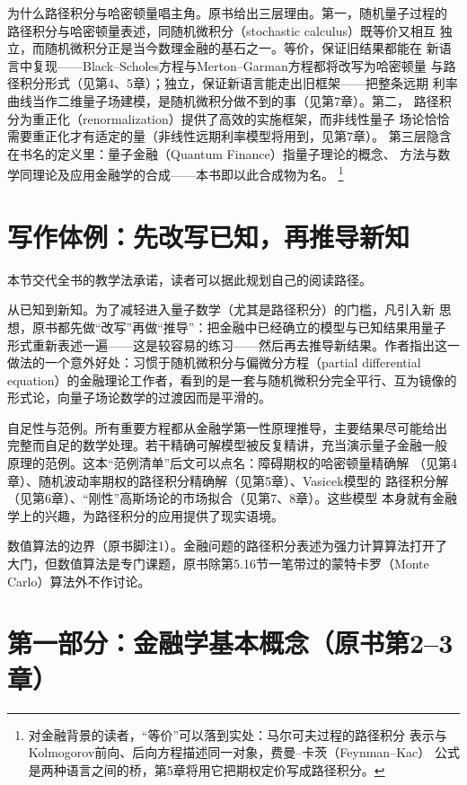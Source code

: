 为什么路径积分与哈密顿量唱主角。原书给出三层理由。第一，随机量子过程的
路径积分与哈密顿量表述，同随机微积分（stochastic calculus）既等价又相互
独立，而随机微积分正是当今数理金融的基石之一。等价，保证旧结果都能在
新语言中复现——Black--Scholes方程与Merton--Garman方程都将改写为哈密顿量
与路径积分形式（见第4、5章）；独立，保证新语言能走出旧框架——把整条远期
利率曲线当作二维量子场建模，是随机微积分做不到的事（见第7章）。第二，
路径积分为重正化（renormalization）提供了高效的实施框架，而非线性量子
场论恰恰需要重正化才有适定的量（非线性远期利率模型将用到，见第7章）。
第三层隐含在书名的定义里：量子金融（Quantum Finance）指量子理论的概念、
方法与数学同理论及应用金融学的合成——本书即以此合成物为名。
\footnote{对金融背景的读者，“等价”可以落到实处：马尔可夫过程的路径积分
表示与Kolmogorov前向、后向方程描述同一对象，费曼--卡茨（Feynman--Kac）
公式是两种语言之间的桥，第5章将用它把期权定价写成路径积分。}

\section{写作体例：先改写已知，再推导新知}

本节交代全书的教学法承诺，读者可以据此规划自己的阅读路径。

从已知到新知。为了减轻进入量子数学（尤其是路径积分）的门槛，凡引入新
思想，原书都先做“改写”再做“推导”：把金融中已经确立的模型与已知结果用量子
形式重新表述一遍——这是较容易的练习——然后再去推导新结果。作者指出这一
做法的一个意外好处：习惯于随机微积分与偏微分方程（partial differential
equation）的金融理论工作者，看到的是一套与随机微积分完全平行、互为镜像的
形式论，向量子场论数学的过渡因而是平滑的。

自足性与范例。所有重要方程都从金融学第一性原理推导，主要结果尽可能给出
完整而自足的数学处理。若干精确可解模型被反复精讲，充当演示量子金融一般
原理的范例。这本“范例清单”后文可以点名：障碍期权的哈密顿量精确解
（见第4章）、随机波动率期权的路径积分精确解（见第5章）、Vasicek模型的
路径积分解（见第6章）、“刚性”高斯场论的市场拟合（见第7、8章）。这些模型
本身就有金融学上的兴趣，为路径积分的应用提供了现实语境。

数值算法的边界（原书脚注1）。金融问题的路径积分表述为强力计算算法打开了
大门，但数值算法是专门课题，原书除第5.16节一笔带过的蒙特卡罗（Monte
Carlo）算法外不作讨论。

\section{第一部分：金融学基本概念（原书第2--3章）}


